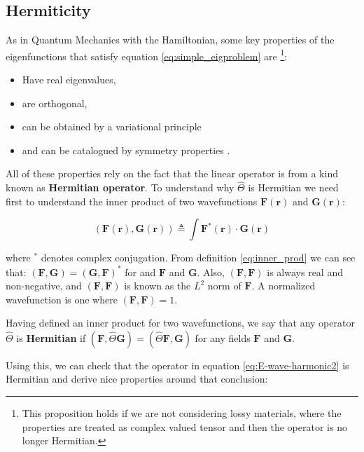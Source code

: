 \subsection{Hermiticity}
As in Quantum Mechanics with the Hamiltonian, some key properties of the eigenfunctions that satisfy equation \ref{eq:simple_eigproblem} are \footnote{This proposition holds if we are not considering lossy materials, where the properties are treated as complex valued tensor and then the operator is no longer Hermitian.}:
\begin{itemize}
\item Have real eigenvalues,
\item are orthogonal,
\item can be obtained by a variational principle
\item and can be catalogued by symmetry properties .
\end{itemize}

All of these properties rely on the fact that the linear operator is from a kind known as \textbf{Hermitian operator}. To understand why $\hat{\Theta}$ is Hermitian we need first to understand the inner product of two wavefunctions $\mathbf{F(r)}$ and $\mathbf{G(r)}$:

\begin{equation}
\left( \mathbf{F(r)},\mathbf{G(r)}\right)  \triangleq
\int \mathbf{F^*(r)}\cdot \mathbf{G(r)}
\label{eq:inner_prod}
\end{equation}

where $^*$ denotes complex conjugation. From definition \ref{eq:inner_prod} we can see that:
$\left(\mathbf{F},\mathbf{G}\right) =  \left(\mathbf{G},\mathbf{F}\right)^*$
 for and $\mathbf{F}$ and $\mathbf{G}$. Also, $\left(\mathbf{F},\mathbf{F}\right)$ is always real and non-negative, and $\left(\mathbf{F},\mathbf{F}\right)$ is known as the $L^2$ norm of $\mathbf{F}$. A normalized wavefunction is one where 
 $\left(\mathbf{F},\mathbf{F}\right)=1$.

Having defined an inner product for two wavefunctions, we say that any operator $\hat{\Theta}$ is \textbf{Hermitian} if $\left(\mathbf{F},\hat{\Theta}\mathbf{G}\right) = \left(\hat{\Theta}\mathbf{F},\mathbf{G}\right)$
for any fields $\mathbf{F}$ and $\mathbf{G}$. 

Using this, we can check that the operator in equation \ref{eq:E-wave-harmonic2} is Hermitian and derive nice properties around that conclusion:

